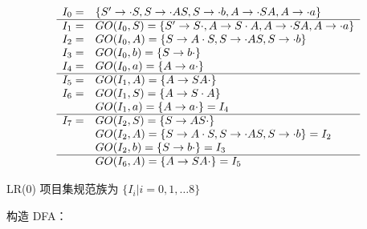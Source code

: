 \begin{enumerate}
\begin{enumerate}
        \begin{equation*}
            \begin{array}{cl}
                I_0 = & \{S' \to \cdot S, S \to \cdot AS, S \to \cdot b, A \to \cdot SA, A \to \cdot a \} \\
                \hline
                I_1 = & GO(I_0, S) = \{S' \to S \cdot, A \to S \cdot A, A \to \cdot SA, A \to \cdot a\} \\
                I_2 = & GO(I_0, A) = \{S \to A \cdot S, S \to \cdot AS, S \to \cdot b \} \\
                I_3 = & GO(I_0, b) = \{S \to b \cdot \} \\
                I_4 = & GO(I_0, a) = \{A \to a \cdot \} \\
                \hline
                I_5 = & GO(I_1, A) = \{A \to SA \cdot \} \\
                I_6 = & GO(I_1, S) = \{A \to S \cdot A\} \\
                    & GO(I_1, a) = \{A \to a \cdot \} = I_4 \\
                \hline
                I_7 = & GO(I_2, S) = \{S \to AS \cdot \} \\
                    & GO(I_2, A) = \{S \to A \cdot S, S \to \cdot AS, S \to \cdot b \} = I_2 \\
                    & GO(I_2, b) = \{S \to b \cdot \} = I_3 \\
                \hline
                    & GO(I_6, A) = \{A \to SA \cdot \} = I_5 \\
            \end{array}
        \end{equation*}
        
        LR(0) 项目集规范族为 $\{I_i | i = 0, 1, \dots 8\}$
        
        构造 DFA：
        
        \begin{figure}[H]
            \centering
\end{figure}
\end{enumerate}
\end{enumerate}
